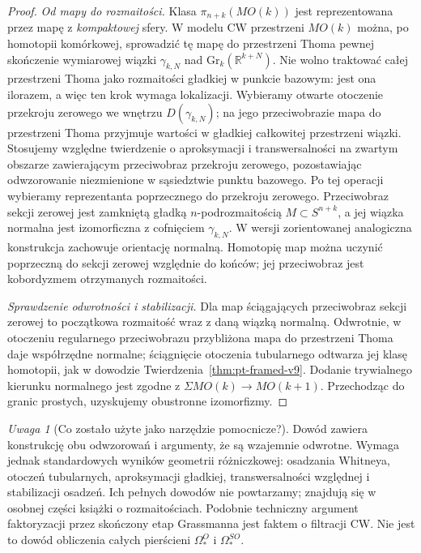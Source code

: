 \documentclass[11pt,a4paper,oneside]{report}
\newcommand{\R}{\mathbb{R}}
\theoremstyle{plain}
\theoremstyle{definition}
\theoremstyle{remark}
\newtheorem{uwaga}[twierdzenie]{Uwaga}
\begin{document}
\begin{proof}
\emph{Od mapy do rozmaitości.}
Klasa $\pi_{n+k}(MO(k))$ jest reprezentowana
przez mapę z \emph{kompaktowej} sfery. W modelu
CW przestrzeni $MO(k)$ można, po homotopii
komórkowej, sprowadzić tę mapę do przestrzeni
Thoma pewnej skończenie wymiarowej wiązki
$\gamma_{k,N}$ nad $\mathrm{Gr}_k(\R^{k+N})$.
Nie wolno traktować całej przestrzeni Thoma jako
rozmaitości gładkiej w punkcie bazowym: jest ona
ilorazem, a więc ten krok wymaga lokalizacji.
Wybieramy otwarte otoczenie przekroju zerowego
we wnętrzu $D(\gamma_{k,N})$; na jego przeciwobrazie
mapa do przestrzeni Thoma przyjmuje wartości
w gładkiej całkowitej przestrzeni wiązki.
Stosujemy względne twierdzenie o aproksymacji
i transwersalności na zwartym obszarze zawierającym
przeciwobraz przekroju zerowego, pozostawiając
odwzorowanie niezmienione w sąsiedztwie punktu bazowego.
Po tej operacji wybieramy reprezentanta poprzecznego
do przekroju zerowego. Przeciwobraz sekcji zerowej
jest zamkniętą gładką
$n$-podrozmaitością $M\subset S^{n+k}$, a jej
wiązka normalna jest izomorficzna z cofnięciem
$\gamma_{k,N}$. W wersji zorientowanej analogiczna
konstrukcja zachowuje orientację normalną.
Homotopię map można uczynić poprzeczną do sekcji
zerowej względnie do końców; jej przeciwobraz jest
kobordyzmem otrzymanych rozmaitości.

\emph{Sprawdzenie odwrotności i stabilizacji.}
Dla map ściągających przeciwobraz sekcji zerowej
to początkowa rozmaitość wraz z daną wiązką normalną.
Odwrotnie, w otoczeniu regularnego przeciwobrazu
przybliżona mapa do przestrzeni Thoma daje współrzędne
normalne; ściągnięcie otoczenia tubularnego odtwarza
jej klasę homotopii, jak w dowodzie
Twierdzenia~\ref{thm:pt-framed-v9}.
Dodanie trywialnego kierunku normalnego jest zgodne
z $\Sigma MO(k)\to MO(k+1)$. Przechodząc do granic
prostych, uzyskujemy obustronne izomorfizmy.
\end{proof}

\begin{uwaga}[Co zostało użyte jako narzędzie pomocnicze?]
Dowód zawiera konstrukcję obu odwzorowań i argumenty,
że są wzajemnie odwrotne. Wymaga jednak standardowych
wyników geometrii różniczkowej: osadzania Whitneya,
otoczeń tubularnych, aproksymacji gładkiej,
transwersalności względnej i stabilizacji osadzeń.
Ich pełnych dowodów nie powtarzamy; znajdują się
w osobnej części książki o rozmaitościach. Podobnie
techniczny argument faktoryzacji przez skończony
etap Grassmanna jest faktem o filtracji CW.
Nie jest to dowód obliczenia całych pierścieni
$\Omega_*^O$ i $\Omega_*^{SO}$.
\end{uwaga}
\end{document}
